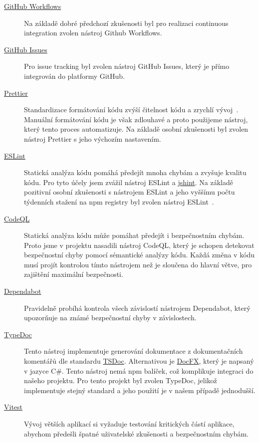 \begin{description}
    \item[\href{https://github.com/features/actions}{GitHub Workflows}]
    Na základě dobré předchozí zkušenosti byl pro realizaci continuous integration zvolen nástroj Github Workflows.
    \item[\href{https://github.com/features/issues}{GitHub Issues}]
    Pro issue tracking byl zvolen nástroj GitHub Issues, který je přímo integrován do platformy GitHub.
    \item[\href{https://prettier.io/}{Prettier}]
    Standardizace formátování kódu zvýší čitelnost kódu a zrychlí vývoj~\cite{why-coding-style-matters}.
    Manuální formátování kódu je však zdlouhavé a proto použijeme nástroj, který tento proces automatizuje.
    Na základě osobní zkušenosti byl zvolen nástroj Prettier s jeho výchozím nastavením.
    \item[\href{https://eslint.org/}{ESLint}]
    Statická analýza kódu pomáhá předejít mnoha chybám a zvyšuje kvalitu kódu.
    Pro tyto účely jsem zvážil nástroj ESLint a \href{https://www.npmjs.com/package/jshint}{jshint}.
    Na základě pozitivní osobní zkušenosti s nástrojem ESLint a jeho vyššímu počtu týdenních stažení na npm registry byl zvolen nástroj ESLint~\cite{eslint, jshint}.
    \item[\href{https://codeql.github.com/}{CodeQL}]
    Statická analýza kódu může pomáhat předejít i bezpečnostním chybám.
    Proto jsme v projektu nasadili nástroj CodeQL, který je schopen detekovat bezpečnostní chyby pomocí sémantické analýzy kódu.
    Každá změna v kódu musí projít kontrolou tímto nástrojem než je sloučena do hlavní větve, pro zajištění maximální bezpečnosti.
    \item[\href{https://github.com/dependabot}{Dependabot}]
    Pravidelně probíhá kontrola všech závislostí nástrojem Dependabot, který upozorňuje na známé bezpečnostní chyby v závislostech.
    \item[\href{https://typedoc.org/}{TypeDoc}]
    Tento nástroj implementuje generování dokumentace z dokumentačních komentářů dle standardu \href{https://tsdoc.org/}{TSDoc}.
    Alternativou je \href{https://github.com/dotnet/docfx}{DocFX}, který je napsaný v jazyce C\#.
    Tento nástroj nemá npm balíček, což komplikuje integraci do našeho projektu.
    Pro tento projekt byl zvolen TypeDoc, jelikož implementuje stejný standard a jeho použití je v našem případě jednodušší.
    \item[\href{https://vitest.dev/}{Vitest}]
    Vývoj větších aplikací si vyžaduje testování kritických částí aplikace, abychom předešli špatné uživatelské zkušenosti a bezpečnostním chybám.

\end{description}
